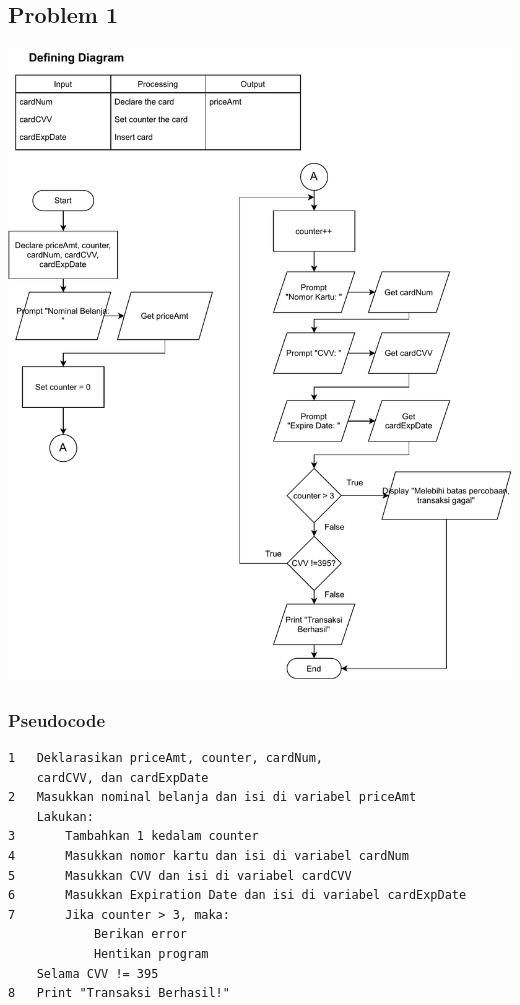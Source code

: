 \documentclass[
  12pt,
  answers  
]{exam}
\begin{document}
	\subsection*{Problem 1}
	\includegraphics[clip, scale=0.8]{pdf/1-Problem1.pdf}
	\pagebreak
	\subsubsection*{Pseudocode}
	\begin{lstlisting}
1	Deklarasikan priceAmt, counter, cardNum, 
	cardCVV, dan cardExpDate
2	Masukkan nominal belanja dan isi di variabel priceAmt
	Lakukan:
3		Tambahkan 1 kedalam counter
4		Masukkan nomor kartu dan isi di variabel cardNum
5		Masukkan CVV dan isi di variabel cardCVV
6		Masukkan Expiration Date dan isi di variabel cardExpDate
7		Jika counter > 3, maka:
 			Berikan error
 			Hentikan program
 	Selama CVV != 395
8	Print "Transaksi Berhasil!"
	\end{lstlisting}
\end{document}
